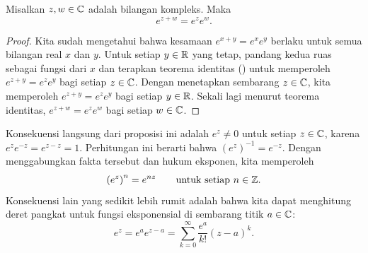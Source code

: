 \begin{myfigureht}
\caption{Grafik bagian real (kiri) dan bagian imajiner (kanan)
dari eksponensial kompleks $e^z = e^{x+iy}$. Sumbu $x$ membentang dari $-4$ hingga
$4$, sumbu $y$ membentang dari $-6$ hingga $6$, dan sumbu vertikal membentang dari
$-e^{4} \approx -54.6$
hingga
$e^{4} \approx 54.6$. Grafik eksponensial real ($y=0$)
ditandai dengan garis tebal.\label{fig:complexexpgraphs}}
\end{myfigureht}

\begin{prop}
Misalkan $z,w \in {\mathbb{C}}$ adalah bilangan kompleks. Maka
\begin{equation*}
e^{z+w} = e^z e^w.
\end{equation*}
\end{prop}

\begin{proof}
Kita sudah mengetahui bahwa kesamaan
$e^{x+y} = e^x e^y$ berlaku untuk semua
bilangan real $x$ dan $y$.
Untuk setiap $y \in {\mathbb{R}}$ yang tetap, pandang kedua ruas sebagai
fungsi dari $x$ dan terapkan teorema identitas
() untuk memperoleh
$e^{z+y} = e^ze^y$ bagi setiap $z \in {\mathbb{C}}$. Dengan menetapkan sembarang $z \in {\mathbb{C}}$,
kita memperoleh
$e^{z+y} = e^ze^y$ bagi setiap $y \in {\mathbb{R}}$. Sekali lagi menurut teorema identitas,
$e^{z+w} = e^z e^w$
bagi setiap $w \in {\mathbb{C}}$.
\end{proof}

Konsekuensi langsung dari proposisi ini adalah $e^z \neq 0$ untuk setiap $z \in {\mathbb{C}}$,
karena $e^z e^{-z} = e^{z-z} = 1$.
Perhitungan ini berarti bahwa ${(e^z)}^{-1} = e^{-z}$.
Dengan menggabungkan fakta tersebut dan hukum eksponen, kita memperoleh
\begin{equation*}
{(e^z)}^{n} = e^{nz} \qquad \text{untuk setiap } n \in {\mathbb{Z}}.
\end{equation*}
Konsekuensi lain yang sedikit lebih rumit adalah bahwa kita
dapat menghitung deret pangkat untuk fungsi eksponensial di sembarang titik $a \in
{\mathbb{C}}$:
\begin{equation*}
e^z = e^a e^{z-a} = \sum_{k=0}^\infty \frac{e^a}{k!} {(z-a)}^k .
\end{equation*}

